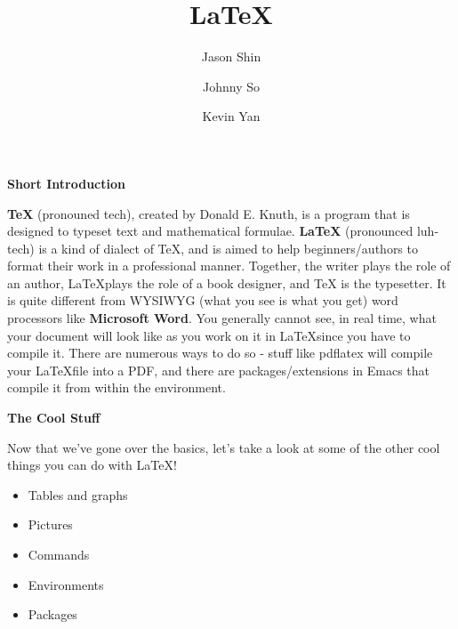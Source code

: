 \documentclass[a4paper,12pt]{article}
\title{LaTeX}
\author{Jason Shin \and Johnny So \and Kevin Yan}
\begin{document}
\maketitle

\newpage
\begin{center}
  \bf{\Huge{Short Introduction}}
\end{center}
\bigskip
\Large
\textbf{\TeX} (pronouned tech), created by Donald E. Knuth, is a program that is
designed to typeset text and mathematical formulae. \textbf{\LaTeX} (pronounced
luh-tech) is a kind of dialect of TeX, and is aimed to help beginners/authors to
format their work in a professional manner. Together, the writer plays the role 
of an author, \LaTeX plays the role of a book designer, and TeX is the 
typesetter. It is quite different from WYSIWYG (what you see is what you get) 
word processors like \textbf{Microsoft Word}. You generally cannot see, in real 
time, what your document will look like as you work on it in \LaTeX since you 
have to compile it. There are numerous ways to do so - stuff like pdflatex will 
compile your \LaTeX file into a PDF, and there are packages/extensions in Emacs 
that compile it from within the environment.

\newpage
\begin{center}
	\bf{\Huge{The Cool Stuff}}
\end{center}
\bigskip 
\Large
Now that we've gone over the basics, let's take a look at some of the other cool things you can do with LaTeX! 
\begin{itemize}
	\item Tables and graphs
	\item Pictures
	\item Commands
	\item Environments
	\item Packages
\end{itemize}
\end{document}
